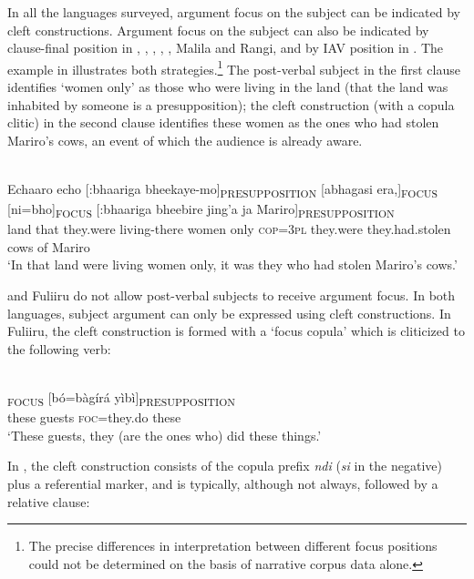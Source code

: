 \documentclass[output=paper]{langsci/langscibook}
\begin{document}
In all the languages surveyed, argument focus on the subject can be indicated by cleft constructions. Argument focus on the subject can also be indicated by clause-final position in , , , , , Malila and Rangi, and by IAV position in . The  example in  illustrates both strategies.\footnote{The precise differences in interpretation between different focus positions could not be determined on the basis of narrative corpus data alone.} The post-verbal subject in the first clause identifies ‘women only’ as those who were living in the land (that the land was inhabited by someone is a presupposition); the cleft construction (with a copula clitic) in the second clause identifies these women as the ones who had stolen Mariro’s cows, an event of which the audience is already aware.

\ea\label{ex:20.nicolle}
\\
\gll Echaaro echo [:bhaariga bheekaye-mo]\textsubscript{PRESUPPOSITION} [abhagasi era,]\textsubscript{FOCUS} [ni=bho]\textsubscript{FOCUS} [:bhaariga bheebire jing’a ja Mariro]\textsubscript{PRESUPPOSITION}\\
land that {\db}they.were living-there {\db}women only {\db}\textsc{cop=3pl} {\db}they.were they.had.stolen cows of Mariro \\
\glt ‘In that land were living women only, it was they who had stolen Mariro’s cows.’
\z

 and Fuliiru do not allow post-verbal subjects to receive argument focus. In both languages, subject argument can only be expressed using cleft constructions. In Fuliiru, the cleft construction is formed with a ‘focus copula’ which is cliticized to the following verb:

\ea\label{ex:21.nicolle}
\\
\textsubscript{FOCUS} [bó=bàgírá yìbì]\textsubscript{PRESUPPOSITION}\\
{\db}these guests {\db}\textsc{foc}=they.do these \\
\glt ‘These guests, they (are the ones who) did these things.’
\z

In , the cleft construction consists of the copula prefix \textit{ndi} (\textit{si} in the negative) plus a referential marker, and is typically, although not always, followed by a relative clause:
\end{document}
